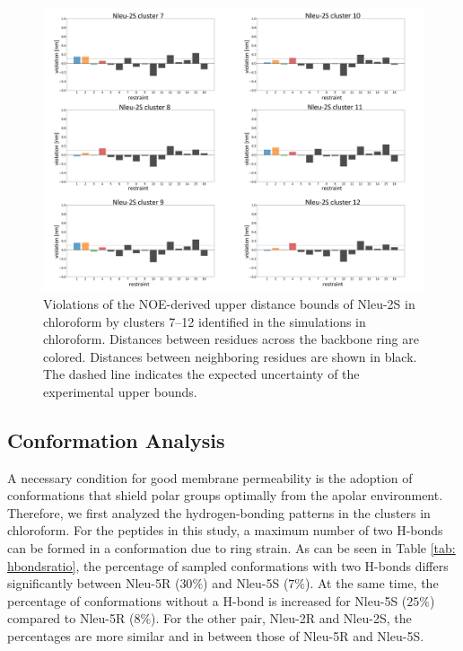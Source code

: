 \begin{figure}[h!]
    \centering
    \includegraphics[width=\textwidth]{7_chapter_5/fig/results/NMR_2Sb.png}
    \caption{Violations of the NOE-derived upper distance bounds of Nleu-2S in chloroform by clusters 7–12 identified in the simulations in chloroform. Distances between residues across the backbone ring are colored. Distances between neighboring residues are shown in black. The dashed line indicates the expected uncertainty of the experimental upper bounds.}
    \label{fig: SINOE violations Nleu-2SII}
\end{figure}

\FloatBarrier

\subsection{Conformation Analysis}
A necessary condition for good membrane permeability is the adoption of conformations that shield polar groups optimally from the apolar environment. \cite{Sebastiano2018, Alex2011, Tyagi2018}
Therefore, we first analyzed the hydrogen-bonding patterns in the clusters in chloroform. For the peptides in this study, a maximum number of two H-bonds can be formed in a conformation due to ring strain. As can be seen in Table \ref{tab: hbondsratio}, the percentage of sampled conformations with two H-bonds differs significantly between Nleu-5R ($30\%$) and Nleu-5S ($7\%$). At the same time, the percentage of conformations without a H-bond is increased for Nleu-5S ($25\%$) compared to Nleu-5R ($8\%$). For the other pair, Nleu-2R and Nleu-2S, the percentages are more similar and in between those of Nleu-5R and Nleu-5S.


